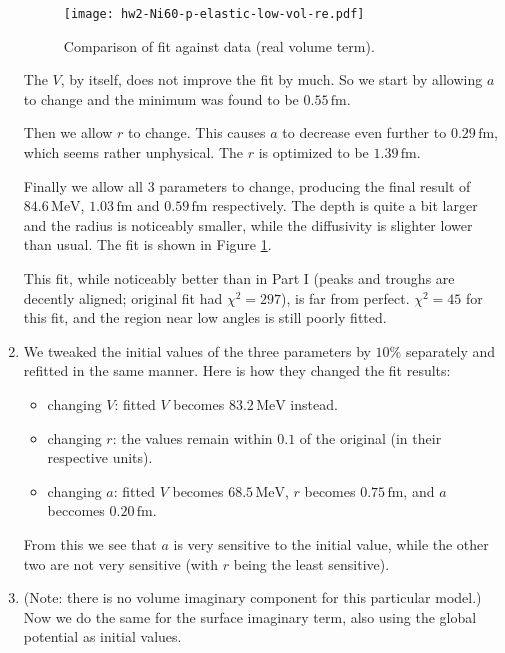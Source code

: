 \documentclass[fleqn, 12pt]{article}
\begin{document}
\begin{enumerate}
  \begin{figure}
    \centering
    \texttt{[image: hw2-Ni60-p-elastic-low-vol-re.pdf]}
    \caption{Comparison of fit against data (real volume term).}
    \label{fig:low-vol-re}
  \end{figure}

  The $V$, by itself, does not improve the fit by much.  So we start by
  allowing $a$ to change and the minimum was found to be $0.55\,\mathrm{fm}$.

  Then we allow $r$ to change.  This causes $a$ to decrease even further to
  $0.29\,\mathrm{fm}$, which seems rather unphysical.  The $r$ is optimized to
  be $1.39\,\mathrm{fm}$.

  Finally we allow all 3 parameters to change, producing the final result of
  $84.6\,\mathrm{MeV}$, $1.03\,\mathrm{fm}$ and $0.59\,\mathrm{fm}$
  respectively.  The depth is quite a bit larger and the radius is noticeably
  smaller, while the diffusivity is slighter lower than usual.  The fit is
  shown in Figure \ref{fig:low-vol-re}.

  This fit, while noticeably better than in Part I (peaks and troughs are
  decently aligned; original fit had $\chi^2 = 297$), is far from perfect.
  $\chi^2 = 45$ for this fit, and the region near low angles is still poorly
  fitted.

\item We tweaked the initial values of the three parameters by $10\%$
  separately and refitted in the same manner.  Here is how they changed the
  fit results:
  \begin{itemize}
  \item changing $V$: fitted $V$ becomes $83.2\,\mathrm{MeV}$ instead.
  \item changing $r$: the values remain within $0.1$ of the original (in their
    respective units).
  \item changing $a$: fitted $V$ becomes $68.5\,\mathrm{MeV}$, $r$ becomes
    $0.75\,\mathrm{fm}$, and $a$ beccomes $0.20\,\mathrm{fm}$.
  \end{itemize}
  From this we see that $a$ is very sensitive to the initial value, while the
  other two are not very sensitive (with $r$ being the least sensitive).

\item (Note: there is no volume imaginary component for this particular
  model.)  Now we do the same for the surface imaginary term, also using the
  global potential as initial values.


\end{enumerate}
\end{document}
